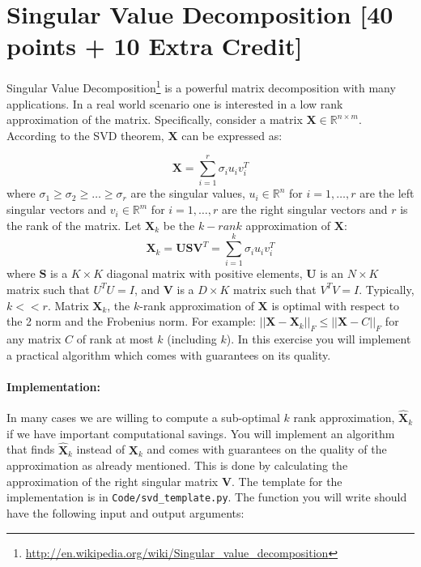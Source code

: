 \documentclass[letterpaper]{article}
\newcommand {\bX}{\mathbf{X}}
\newcommand {\bU}{\mathbf{U}}
\newcommand {\bS}{\mathbf{S}}
\newcommand {\bV}{\mathbf{V}}
\begin{document}
\section{Singular Value Decomposition [40 points + 10 Extra Credit]}
Singular Value Decomposition\footnote{\url{http://en.wikipedia.org/wiki/Singular_value_decomposition}} is a powerful matrix decomposition with many applications. In a real world scenario one is interested in a low rank approximation of the matrix. 
Specifically, consider a matrix $\bX \in \mathbb{R}^{n \times m}$. 
According to the SVD theorem, $\bX$ can be expressed as:

\begin{equation}
\bX = \sum_{i=1}^r \sigma_i u_i v_i^T
\label{eq:svd1}
\end{equation} 
where $\sigma_1 \geq \sigma_2 \geq \ldots \geq \sigma_r$ are the singular 
values, $u_i \in \mathbb{R}^n$ for $i=1,\ldots,r$ are the left singular
vectors and $v_i \in \mathbb{R}^m$ for $i=1,\ldots,r$ are the right singular
vectors and $r$ is the rank of the matrix. 
Let $\bX_k$ be the $k-rank$ approximation of $\bX$:
\begin{equation}
\bX_k = \bU\bS\bV^T = \sum_{i=1}^k \sigma_i u_i v_i^T
\label{eq:svd2}
\end{equation} 
where $\bS$ is a $K \times K$ diagonal matrix with positive elements, $\bU$ is an $N \times K$ matrix such that $U^TU = I$, and $\bV$ is a $D \times K$ matrix such that $V^TV = I$. Typically, $k<<r$. Matrix $\bX_k$, the $k$-rank approximation of $\bX$ is optimal with respect to the 2 norm and the Frobenius norm.
For example: $|| \bX- \bX_k||_F \leq ||\bX-C||_F$ for any matrix $C$ of rank at most $k$ (including $k$). 
In this exercise you will implement a practical algorithm which comes with guarantees on its quality.

\paragraph{\textbf{Implementation:}}
In many cases we are willing to compute a sub-optimal $k$ rank approximation, $\hat{\bX}_k$ if we have important computational savings. You will implement an algorithm that finds $\hat{\bX}_k$ instead of $\bX_k$ and comes with guarantees on the quality of the approximation as already mentioned. This is done by calculating the approximation of the right singular matrix $\bV$.  The template for the implementation is in \texttt{Code/svd\_template.py}. 
The function you will write should have the following input and output arguments: 
\end{document}
